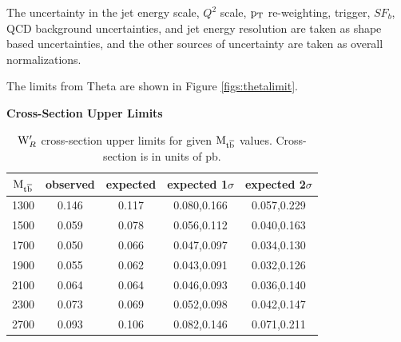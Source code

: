 The uncertainty in the jet energy scale, $Q^2$ scale, $\mathrm{p_{T}}$ re-weighting, trigger, $SF_b$, QCD background uncertainties, and jet energy resolution are taken 
as shape based uncertainties, and the other sources of uncertainty are taken as overall normalizations.  

The limits from Theta are shown in Figure \ref{figs:thetalimit}.

\begin{table}
\begin{center}
\bf{Cross-Section Upper Limits}\\
\begin{tabular}{c||c|c|c|c}
\hline
\hline
\bf{$\mathrm{M_{{t\overline{b}}}}$} & \bf{observed}  & \bf{expected} & \bf{expected 1$\sigma$}  & \bf{expected 2$\sigma$} \\
\hline
\hline
1300 & 0.146 & 0.117 & 0.080,0.166 & 0.057,0.229\\
\hline
1500 & 0.059 & 0.078 & 0.056,0.112 & 0.040,0.163\\
\hline
1700 & 0.050 & 0.066 & 0.047,0.097 & 0.034,0.130\\
\hline
1900 & 0.055 & 0.062 & 0.043,0.091 & 0.032,0.126\\
\hline
2100 & 0.064 & 0.064 & 0.046,0.093 & 0.036,0.140\\
\hline
2300 & 0.073 & 0.069 & 0.052,0.098 & 0.042,0.147\\
\hline
2700 & 0.093 & 0.106 & 0.082,0.146 & 0.071,0.211\\
\hline
\end{tabular}
\end{center}
\caption{$\mathrm{W}^\prime_R$ cross-section upper limits for given $\mathrm{M_{{t\overline{b}}}}$ values.  Cross-section is in units of pb.}
\label{table:upperxsec}
\end{table}


